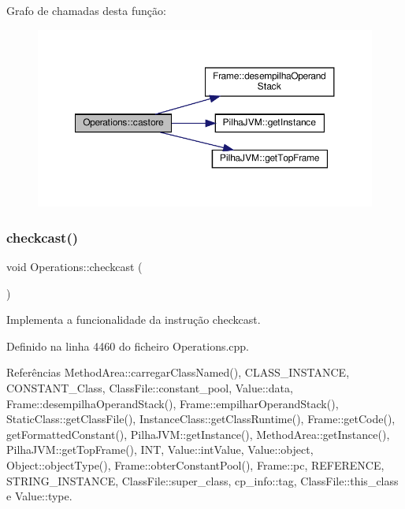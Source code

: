 Grafo de chamadas desta função\+:
\nopagebreak
\begin{figure}[H]
\begin{center}
\leavevmode
\includegraphics[width=350pt]{classOperations_a417c4833f2f048350920358961cfab03_cgraph}
\end{center}
\end{figure}
\mbox{\label{classOperations_aa4f0f3c8617af197e4a4e2dc62cb9c35}} 
\subsubsection{\texorpdfstring{checkcast()}{checkcast()}}
{\footnotesize\ttfamily void Operations\+::checkcast (\begin{DoxyParamCaption}{ }\end{DoxyParamCaption})\hspace{0.3cm}{\ttfamily [private]}}



Implementa a funcionalidade da instrução checkcast. 



Definido na linha 4460 do ficheiro Operations.\+cpp.



Referências Method\+Area\+::carregar\+Class\+Named(), C\+L\+A\+S\+S\+\_\+\+I\+N\+S\+T\+A\+N\+CE, C\+O\+N\+S\+T\+A\+N\+T\+\_\+\+Class, Class\+File\+::constant\+\_\+pool, Value\+::data, Frame\+::desempilha\+Operand\+Stack(), Frame\+::empilhar\+Operand\+Stack(), Static\+Class\+::get\+Class\+File(), Instance\+Class\+::get\+Class\+Runtime(), Frame\+::get\+Code(), get\+Formatted\+Constant(), Pilha\+J\+V\+M\+::get\+Instance(), Method\+Area\+::get\+Instance(), Pilha\+J\+V\+M\+::get\+Top\+Frame(), I\+NT, Value\+::int\+Value, Value\+::object, Object\+::object\+Type(), Frame\+::obter\+Constant\+Pool(), Frame\+::pc, R\+E\+F\+E\+R\+E\+N\+CE, S\+T\+R\+I\+N\+G\+\_\+\+I\+N\+S\+T\+A\+N\+CE, Class\+File\+::super\+\_\+class, cp\+\_\+info\+::tag, Class\+File\+::this\+\_\+class e Value\+::type.



